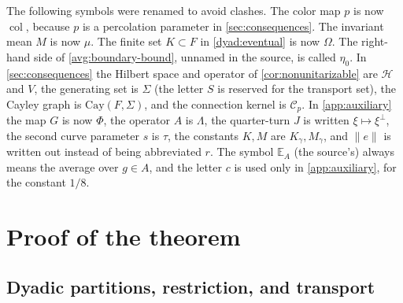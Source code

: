 \documentclass[11pt]{article}
\newcommand{\norm}[1]{\lVert #1\rVert}
\DeclareMathOperator{\colr}{col}
\theoremstyle{definition}
\numberwithin{equation}{section}
\begin{document}
The following symbols were renamed to avoid clashes. The color map \(p\) is
now \(\colr\), because \(p\) is a percolation parameter in
\cref{sec:consequences}. The invariant mean \(M\) is now \(\mu\). The finite
set \(K\subset F\) in \cref{dyad:eventual} is now \(\Omega\). The right-hand
side of \eqref{avg:boundary-bound}, unnamed in the source, is called
\(\eta_0\). In \cref{sec:consequences} the Hilbert space and operator of
\cref{cor:nonunitarizable} are \(\mathcal H\) and \(V\), the generating set
is \(\Sigma\) (the letter \(S\) is reserved for the transport set), the
Cayley graph is \(\mathrm{Cay}(F,\Sigma)\), and the connection kernel is
\(\mathcal C_p\). In \cref{app:auxiliary} the map \(G\) is now \(\Phi\), the
operator \(A\) is \(\Lambda\), the quarter-turn \(J\) is written
\(\xi\mapsto\xi^\perp\), the second curve parameter \(s\) is \(\tau\), the
constants \(K,M\) are \(K_\gamma,M_\gamma\), and \(\norm{e}\) is written out
instead of being abbreviated \(r\). The symbol \(\mathbb E_A\) (the source's)
always means the average over \(g\in A\), and the letter \(c\) is used only
in \cref{app:auxiliary}, for the constant \(1/8\).

\section{Proof of the theorem}\label{sec:proof}

\subsection{Dyadic partitions, restriction, and transport}\label{sec:dyadic}
\end{document}
